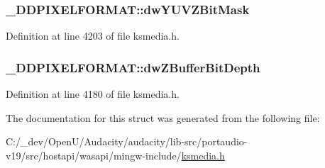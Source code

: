 \subsubsection[{\texorpdfstring{dw\+Y\+U\+V\+Z\+Bit\+Mask}{dwYUVZBitMask}}]{ \+\_\+\+D\+D\+P\+I\+X\+E\+L\+F\+O\+R\+M\+A\+T\+::dw\+Y\+U\+V\+Z\+Bit\+Mask}\hypertarget{struct___d_d_p_i_x_e_l_f_o_r_m_a_t_aa55dcb9b7bbc24858c8a67d0c70b926d}{}\label{struct___d_d_p_i_x_e_l_f_o_r_m_a_t_aa55dcb9b7bbc24858c8a67d0c70b926d}


Definition at line 4203 of file ksmedia.\+h.

\subsubsection[{\texorpdfstring{dw\+Z\+Buffer\+Bit\+Depth}{dwZBufferBitDepth}}]{ \+\_\+\+D\+D\+P\+I\+X\+E\+L\+F\+O\+R\+M\+A\+T\+::dw\+Z\+Buffer\+Bit\+Depth}\hypertarget{struct___d_d_p_i_x_e_l_f_o_r_m_a_t_a45a93e2fa98814e64dea5e451ddcf1ca}{}\label{struct___d_d_p_i_x_e_l_f_o_r_m_a_t_a45a93e2fa98814e64dea5e451ddcf1ca}


Definition at line 4180 of file ksmedia.\+h.



The documentation for this struct was generated from the following file\+:\begin{DoxyCompactItemize}
\item 
C\+:/\+\_\+dev/\+Open\+U/\+Audacity/audacity/lib-\/src/portaudio-\/v19/src/hostapi/wasapi/mingw-\/include/\hyperlink{ksmedia_8h}{ksmedia.\+h}\end{DoxyCompactItemize}
